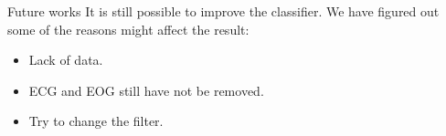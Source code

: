 \documentclass[xcolor=dvipsnames]{beamer} %
\begin{document}
	\begin{frame}{Future works}
	    It is still possible to improve the classifier. We have figured out some of the reasons might affect the result:
	    \begin{itemize}
	        \item Lack of data.
	        \item ECG and EOG still have not be removed.
	        \item Try to change the filter.
	    \end{itemize}
	\end{frame}
	
\end{document}
